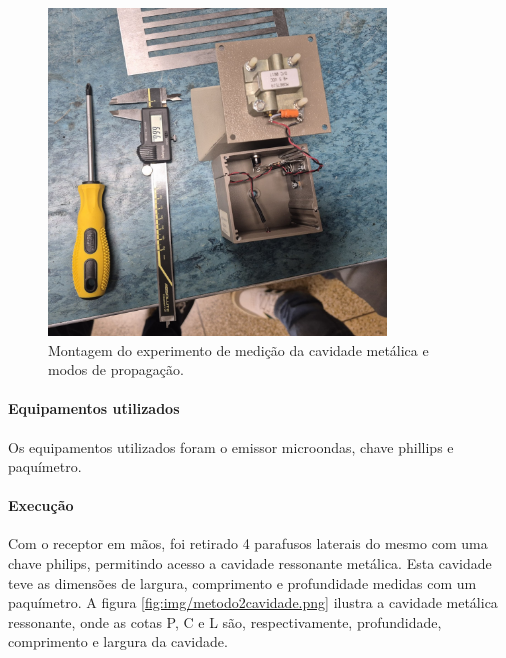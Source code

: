 \documentclass[12pt]{article}
\begin{document}
\begin{figure}[H]
  \centering
  \includegraphics[width=0.8\textwidth]{img/metodo2montagem.png}
  \caption{Montagem do experimento de medição da cavidade metálica e
  modos de propagação.}
  \label{fig:img/metodo2montagem.png}
\end{figure}

\paragraph{Equipamentos utilizados}
Os equipamentos utilizados foram o emissor microondas, chave phillips
e paquímetro.

\paragraph{Execução}
Com o receptor em mãos, foi retirado 4 parafusos laterais do mesmo
com uma chave philips, permitindo acesso a cavidade ressonante
metálica. Esta cavidade teve as dimensões de largura, comprimento e
profundidade medidas com um paquímetro. A figura
\ref{fig:img/metodo2cavidade.png} ilustra a cavidade metálica
ressonante, onde as cotas P, C e L são, respectivamente,
profundidade, comprimento e largura da cavidade.
\end{document}
